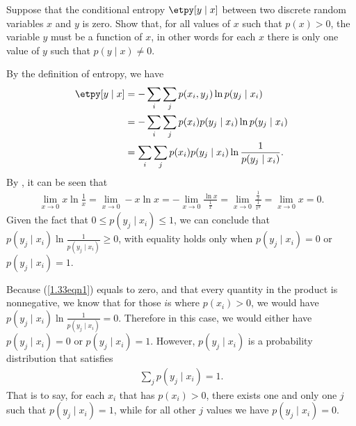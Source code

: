\begin{question}{1.33}
	Suppose that the conditional entropy $\etpy[y \mid x]$ between two discrete random variables $x$ and $y$ is zero. Show that, for all values of $x$ such that $p(x) > 0$, the variable $y$ must be a function of $x$, in other words for each $x$ there is only one value of $y$ such that $p(y \mid x) \neq 0$.
\end{question}

\begin{answer}{}
	By the definition of entropy, we have
	\begin{align}
		\etpy[y \mid x] &= -\sum_{i} \sum_{j} p(x_i, y_j) \ln p(y_j \mid x_i)\\
		&= -\sum_{i} \sum_{j} p(x_i)p(y_j \mid x_i) \ln p(y_j \mid x_i)\\
		&= \sum_{i} \sum_{j} p(x_i)p(y_j \mid x_i) \ln \frac{1}{p(y_j \mid x_i)}. \label{1.33eqn1}
	\end{align}
	By \lhopitalsrule, it can be seen that
	\begin{align}
		\lim_{x \rightarrow 0} x \ln \frac{1}{x} = \lim_{x \rightarrow 0} -x \ln x = -\lim_{x \rightarrow 0} \frac{\ln x}{\frac{1}{x}} = \lim_{x \rightarrow 0} \frac{\frac{1}{x}}{\frac{1}{x^2}} = \lim_{x \rightarrow 0} x = 0.
	\end{align}
	Given the fact that $0 \leq p(y_j \mid x_i) \leq 1$, we can conclude that $p(y_j \mid x_i) \ln \frac{1}{p(y_j \mid x_i)} \geq 0$, with equality holds only when $p(y_j \mid x_i) = 0$ or $p(y_j \mid x_i) = 1$. 
	
	Because (\ref{1.33eqn1}) equals to zero, and that every quantity in the product is nonnegative, we know that for those $i$s where $p(x_i) > 0$, we would have $p(y_j \mid x_i) \ln \frac{1}{p(y_j \mid x_i)} = 0$. Therefore in this case, we would either have $p(y_j \mid x_i) = 0$ or $p(y_j \mid x_i) = 1$. However, $p(y_j \mid x_i)$ is a probability distribution that satisfies
	\begin{align}
		\sum_{j} p(y_j \mid x_i) = 1.
	\end{align}
	That is to say, for each $x_i$ that has $p(x_i) > 0$, there exists one and only one $j$ such that $p(y_j \mid x_i) = 1$, while for all other $j$ values we have $p(y_j \mid x_i)  = 0$.
\end{answer}